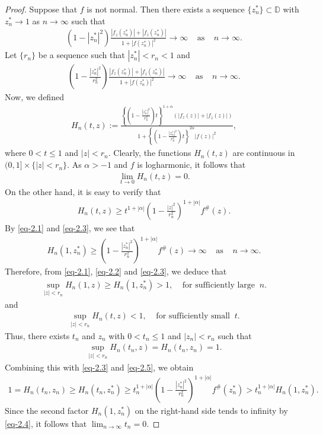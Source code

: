 \documentclass[10pt,a4paper]{amsart}
\begin{document}
\begin{proof}
Suppose that $f$ is not normal. Then there exists a sequence $\{z^*_n\}\subset\mathbb{D}$ with $z^*_n\rightarrow 1$ as $n\rightarrow\infty$ such that 
\begin{align*}
	\left(1-|z^*_n|^2\right)\frac{|f_z(z^*_n)|+|f_{\overline{z}}(z^*_n)|}{1+|f(z^*_n)|^2}\rightarrow\infty \;\;\;\; \mbox{as}\;\;\;\;n\rightarrow\infty.
\end{align*}
Let $\{r_n\}$ be a sequence such that $|z^*_n|<r_n<1$ and
\begin{align}\label{eq-2.1}
	\left(1-\frac{|z^*_n|^2}{r^2_n}\right)\frac{|f_z(z^*_n)|+|f_{\overline{z}}(z^*_n)|}{1+|f(z^*_n)|^2}\rightarrow\infty \;\;\;\; \mbox{as}\;\;\;\;n\rightarrow\infty.
\end{align}
Now, we defined
\begin{align*}
	H_n(t,z):=\frac{\left\{\left(1-\frac{|z^*_n|^2}{r^2_n}\right)t\right\}^{1+\alpha}\left(|f_z(z)|+|f_{\overline{z}}(z)|\right)}{1 + \left\{\left(1-\frac{|z^*_n|^2}{r^2_n}\right)t\right\}^{2\alpha} |f(z)|^2},
\end{align*}
where $0<t\leq 1$ and $|z|<r_n$. Clearly, the functions $H_n(t,z)$ are continuous in $(0,1]\times\{|z|<r_n\}$. As $\alpha>-1$ and $f$ is logharmonic, it follows that
\begin{align}\label{eq-2.2}
	\lim_{t\rightarrow 0} H_n(t,z)=0.
\end{align}
On the other hand, it is easy to verify that
\begin{align}\label{eq-2.3}
	H_n(t,z)\geq t^{1+|\alpha|}\left(1-\frac{|z|^2}{r^2_n} \right)^{1+|\alpha|}  f^{\#}(z).
\end{align}
By \eqref{eq-2.1} and \eqref{eq-2.3}, we see that
\begin{align}\label{eq-2.4}
	H_n(1,z^*_n)\geq \left(1-\frac{|z^*_n|^2}{r^2_n} \right)^{1 +|\alpha|} f^{\#}(z)\rightarrow\infty \;\;\;\;\mbox{as} \;\;\;\;n\rightarrow \infty.
\end{align}
Therefore, from \eqref{eq-2.1}, \eqref{eq-2.2} and \eqref{eq-2.3}, we deduce that
\begin{align*}
	\sup_{|z|<r_n} H_n(1,z)\geq H_n(1,z^*_n)>1,\;\;\;\;\mbox{for sufficiently large} \;\; n.
\end{align*}
and
\begin{align*}
	\sup_{|z|<r_n} H_n(t,z)< 1,\;\;\;\;\mbox{for sufficiently small} \;\; t.
\end{align*}
Thus, there exists $t_n$ and $z_n$ with $0<t_n\leq 1$ and $|z_n|<r_n$ such that
\begin{align}\label{eq-2.5}
	\sup_{|z|<r_n} H_n(t_n,z)= H_n(t_n,z_n)=1.
\end{align}
Combining this with \eqref{eq-2.3} and \eqref{eq-2.5}, we obtain
\begin{align*}
	1=H_n(t_n,z_n)\geq H_n(t_n,z^*_n)\geq t^{1+|\alpha|}_n\left(1- \frac{|z^*_n|^2}{r^2_n}\right)^{1+|\alpha|}  f^{\#}(z^*_n)> t^{1+|\alpha|}_n H_n(1,z^*_n).
\end{align*}
Since the second factor $H_n(1,z^*_n)$ on the right-hand side tends to infinity by \eqref{eq-2.4}, it follows that $\lim_{n\rightarrow\infty} t_n=0$.\vspace{2mm}


\end{proof}
\end{document}
